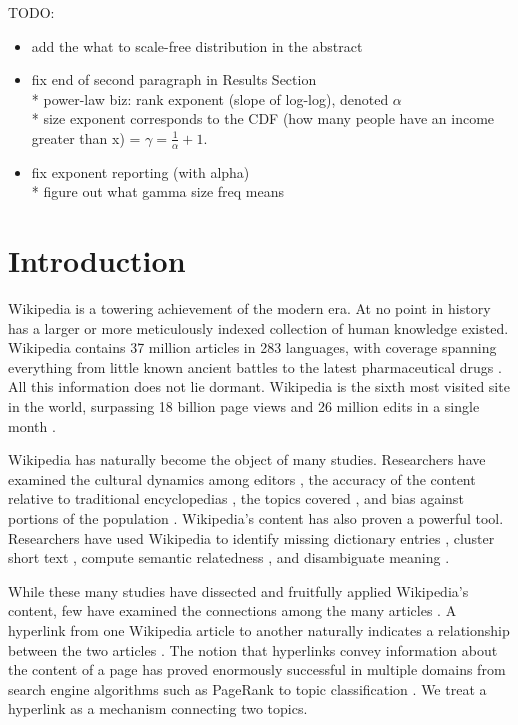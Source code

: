 \documentclass[pre,twocolumn,twoside,superscriptaddress,floatfix, aps, 10pt]{revtex4-1}
\begin{document}
\maketitle

TODO: 
\begin{itemize}
    \item add the what to scale-free distribution in the abstract
    \item fix end of second paragraph in Results Section\\
    * power-law biz: rank exponent (slope of log-log), denoted $\alpha$ \\
    * size exponent corresponds to the CDF (how many people have an income greater than x)
    = $\gamma = \frac{1}{\alpha} + 1$.
\item fix exponent reporting (with alpha) \\
    * figure out what gamma size freq means
\end{itemize}

\section{Introduction}

Wikipedia is a towering achievement of the modern era. 
At no point in history has a larger or more meticulously indexed collection of human knowledge 
existed.
Wikipedia contains 37 million articles in 283 languages, 
with coverage spanning everything from little known ancient battles to the latest pharmaceutical drugs 
\cite{drugs, stats}.
All this information does not lie dormant. 
Wikipedia is the sixth most visited
site in the world, surpassing 18 billion page views and 26 million edits in a single month
\cite{wiki_edits, wiki_views}.

Wikipedia has naturally become the object of many studies. 
Researchers have examined the cultural dynamics among editors
\cite{editors},
the accuracy of the content relative to traditional encyclopedias
\cite{accuracy1, accuracy2},
the topics covered 
\cite{coverage},
and bias against portions of the population
\cite{bias_women}.
Wikipedia's content has also proven a powerful tool. 
Researchers have used Wikipedia to identify missing dictionary entries
\cite{missing_entries},
cluster short text
\cite{clustering},
compute semantic relatedness
\cite{semantic_relatedness},
and disambiguate meaning \cite{disambiguating}.

While these many studies have dissected and fruitfully applied Wikipedia's content,
few have examined the connections among the many articles
\cite{links_that_speak}.
A hyperlink from one Wikipedia article to another
naturally indicates a relationship between the two articles
\cite{relevance}.
The notion that hyperlinks convey information about the content of a
page has proved enormously successful in multiple domains from search engine algorithms 
such as PageRank 
\cite{pagerank} 
to topic classification
\cite{classifier}.
We treat a hyperlink as a mechanism connecting two topics.
\end{document}
